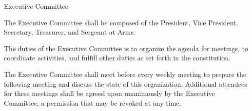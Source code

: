 {
\begin{article}{Executive Committee}
	\item The Executive Committee shall be composed of the President, Vice President, Secretary, Treasurer, and Sergeant at Arms.
	\item The duties of the Executive Committee is to organize the agenda for meetings, to coordinate activities, and fulfill other duties as set forth in the constitution.
	\item The Executive Committee shall meet before every weekly meeting to prepare the following meeting and discuss the state of this organization.  Additional attendees for these meetings shall be agreed upon unanimously by the Executive Committee, a permission that may be revoked at any time.
\end{article}
}
